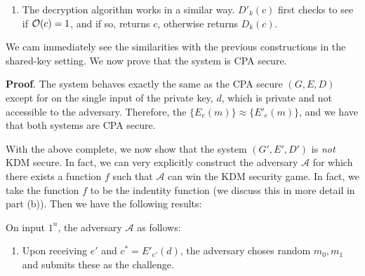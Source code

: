 \documentclass{article}
\begin{document}
\begin{enumerate}[,label=\alph*.]
\begin{enumerate}[noitemsep,topsep=\mdcompacttopsep]
\item{}The decryption algorithm works in a similar way. $D'_k(c)$ first checks to see if $\mathcal{O}(c) = 1$, and 
if so, returns $c$, otherwise returns $D_k(c)$.%
\end{enumerate}%

We cam immediately see the similarities with the previous constructions in the shared-key setting.
We now prove that the system is CPA secure.%

\begin{mdbmarginx}{1ex}{0pt}{1ex}{0pt}%
\noindent{}\textbf{Proof}.   The system behaves exactly the same as the CPA secure $(G,E,D)$ except for on the single input 
 of the private key, $d$, which is private and not accessible to the adversary.
 Therefore, the $\{E_e(m)\} \approx \{E'_e(m)\}$, and we have that both systems are CPA secure.
 \mdfloatright{\ensuremath{\Box}}%
\end{mdbmarginx}%

With the above complete, we now show that the system $(G',E',D')$ is \emph{not} KDM secure. In fact,
we can very explicitly construct the adversary $\mathcal{A}$ for which there exists a function
$f$ such that $\mathcal{A}$ can win the KDM security game. In fact, we take the function $f$ to 
be the indentity function (we discuss this in more detail in part (b)). Then we have the following
results:%

On input $1^n$, the adversary $\mathcal{A}$ as follows:%

\begin{enumerate}[noitemsep,topsep=\mdcompacttopsep]%

\item{}Upon receiving $e'$ and $c^* = E'_{e'}(d)$, the adversary choses random $m_0,m_1$ and submits these as the challenge.%


\end{enumerate}
\end{enumerate}
\end{document}
